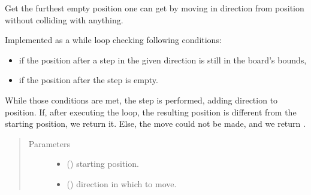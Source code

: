 \documentclass[letterpaper,10pt,english]{sphinxmanual}
\begin{document}
\begin{fulllineitems}
\begin{fulllineitems}
\begin{quote}
\begin{description}
\end{description}\end{quote}

\end{fulllineitems}


\begin{fulllineitems}
\label{\detokenize{neutron:neutron.NeutronBoard.furthest_empty_spot}}
Get the furthest empty position one can get by moving in direction
 from position  without colliding with anything.

Implemented as a while loop checking following conditions:
\begin{itemize}
\item {} 
if the position after a step in the given direction is still in
the board’s bounds,

\item {} 
if the position after the step is empty.

\end{itemize}

While those conditions are met, the step is performed, adding direction
to position.
If, after executing the loop, the resulting position is different from
the starting position, we return it. Else, the move could not be made,
and we return .
\begin{quote}\begin{description}
\item[{Parameters}] \leavevmode\begin{itemize}
\item {} 
 ({\hyperref[\detokenize{util:util.Vec}]{}}) \textendash{} starting position.

\item {} 
 () \textendash{} direction in which to move.


\end{itemize}
\end{description}
\end{quote}
\end{fulllineitems}
\end{fulllineitems}
\end{document}
